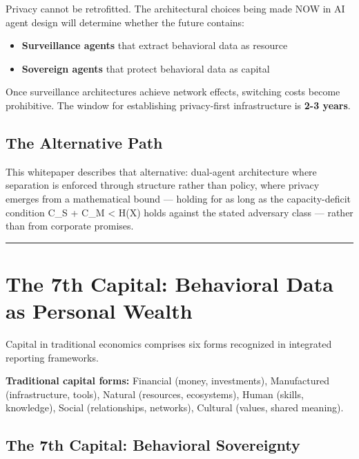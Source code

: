 \documentclass[
  11pt,
]{article}
\providecommand{\tightlist}{%
  \setlength{\itemsep}{0pt}\setlength{\parskip}{0pt}}
\begin{document}
Privacy cannot be retrofitted. The architectural choices being made NOW
in AI agent design will determine whether the future contains:

\begin{itemize}
\tightlist
\item
  \textbf{Surveillance agents} that extract behavioral data as resource
\item
  \textbf{Sovereign agents} that protect behavioral data as capital
\end{itemize}

Once surveillance architectures achieve network effects, switching costs
become prohibitive. The window for establishing privacy-first
infrastructure is \textbf{2-3 years}.

\subsection{The Alternative Path}\label{the-alternative-path}

This whitepaper describes that alternative: dual-agent architecture
where separation is enforced through structure rather than policy, where
privacy emerges from a mathematical bound --- holding for as long as the
capacity-deficit condition C\_S + C\_M \textless{} H(X) holds against
the stated adversary class --- rather than from corporate promises.

\begin{center}\rule{0.5\linewidth}{0.5pt}\end{center}

\section{The 7th Capital: Behavioral Data as Personal
Wealth}\label{the-7th-capital-behavioral-data-as-personal-wealth}

Capital in traditional economics comprises six forms recognized in
integrated reporting frameworks.

\textbf{Traditional capital forms:} Financial (money, investments),
Manufactured (infrastructure, tools), Natural (resources, ecosystems),
Human (skills, knowledge), Social (relationships, networks), Cultural
(values, shared meaning).

\subsection{The 7th Capital: Behavioral
Sovereignty}\label{the-7th-capital-behavioral-sovereignty}
\end{document}
